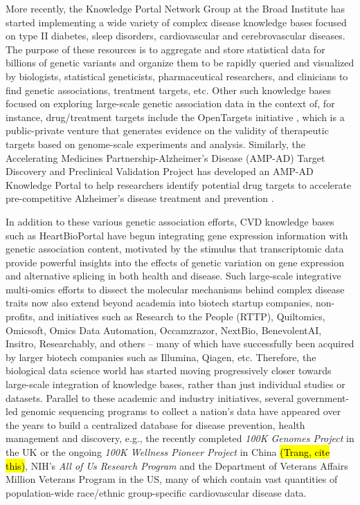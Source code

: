 \documentclass[letter]{bioinfo}
\begin{document}
More recently, the Knowledge Portal Network Group at the Broad Institute has started implementing a wide variety of complex disease knowledge bases focused on type II diabetes, sleep disorders, cardiovascular and cerebrovascular diseases.  The purpose of these resources is to aggregate and store statistical data for billions of genetic variants and organize them to be rapidly queried and visualized by biologists, statistical geneticists, pharmaceutical researchers, and clinicians to find genetic associations, treatment targets, etc.  Other such knowledge bases focused on exploring large-scale genetic association data in the context of, for instance, drug/treatment targets include the OpenTargets initiative \citep{Koscielny:2017:Open}, which is a public-private venture that generates evidence on the validity of therapeutic targets based on genome-scale experiments and analysis.  Similarly, the Accelerating Medicines Partnership-Alzheimer's Disease (AMP-AD) Target Discovery and Preclinical Validation Project has developed an AMP-AD Knowledge Portal to help researchers identify potential drug targets to accelerate pre-competitive Alzheimer's disease treatment and prevention \citep{NIA:2015:AMP}.  
	
	In addition to these various genetic association efforts, CVD knowledge bases such as HeartBioPortal \citep{Khomtchouk:2018:HeartBioPortal} have begun integrating gene expression information with genetic association content, motivated by the stimulus that transcriptomic data provide powerful insights into the effects of genetic variation on gene expression and alternative splicing in both health and disease.  Such large-scale integrative multi-omics efforts to dissect the molecular mechanisms behind complex disease traits now also extend beyond academia into biotech startup companies, non-profits, and initiatives such as Research to the People (RTTP), Quiltomics, Omicsoft, Omics Data Automation, Occamzrazor, NextBio, BenevolentAI, Insitro, Researchably, and others -- many of which have successfully been acquired by larger biotech companies such as Illumina, Qiagen, etc.  Therefore, the biological data science world has started moving progressively closer towards large-scale integration of knowledge bases, rather than just individual studies or datasets.  Parallel to these academic and industry initiatives, several government-led genomic sequencing programs to collect a nation's data have appeared over the years to build a centralized database for disease prevention, health management and discovery, e.g., the recently completed \textit{100K Genomes Project} in the UK \citep{Caulfield:2017:100K} or the ongoing \textit{100K Wellness Pioneer Project} in China \hl{(Trang, cite this)}, NIH's \textit{All of Us Research Program} \citep{NIH:2018:All} and the Department of Veterans Affairs Million Veterans Program \citep{Gaziano:2016:Million} in the US, many of which contain vast quantities of population-wide race/ethnic group-specific cardiovascular disease data.  
\end{document}
